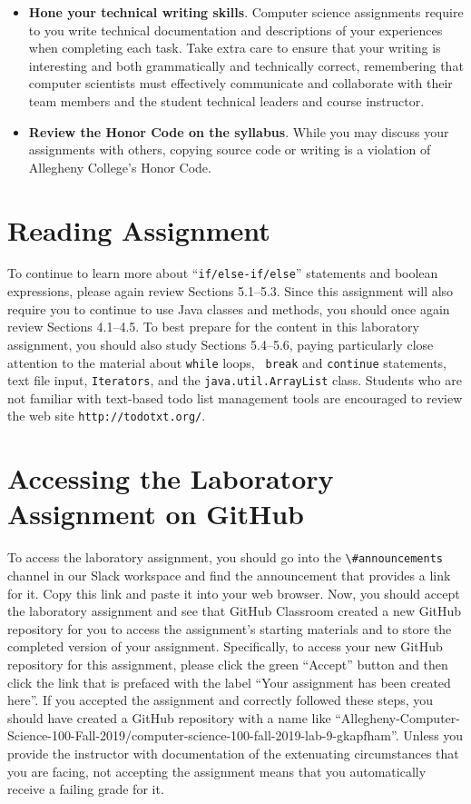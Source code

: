 \documentclass[11pt]{article}
\newcommand{\url}[1]{\lstinline{#1}}
\newcommand{\channel}[1]{\lstinline{#1}}
\begin{document}
\begin{itemize}
\item {\bf Hone your technical writing skills}. Computer science assignments
  require to you write technical documentation and descriptions of your
  experiences when completing each task. Take extra care to ensure that your
  writing is interesting and both grammatically and technically correct,
  remembering that computer scientists must effectively communicate and
  collaborate with their team members and the student technical leaders and
  course instructor.

\item {\bf Review the Honor Code on the syllabus}. While you may discuss your
  assignments with others, copying source code or writing is a violation of
  Allegheny College's Honor Code.

\end{itemize}

\section*{Reading Assignment}

To continue to learn more about ``{\tt if/else-if/else}'' statements and boolean
expressions, please again review Sections 5.1--5.3. Since this assignment will
also require you to continue to use Java classes and methods, you should once
again review Sections 4.1--4.5. To best prepare for the content in this
laboratory assignment, you should also study Sections 5.4--5.6, paying
particularly close attention to the material about {\tt while} loops, {\tt
break} and {\tt continue} statements, text file input, {\tt Iterators}, and the
{\tt java.util.ArrayList} class. Students who are not familiar with text-based
todo list management tools are encouraged to review the web site
\url{http://todotxt.org/}.

\section*{Accessing the Laboratory Assignment on GitHub}

To access the laboratory assignment, you should go into the
\channel{\#announcements} channel in our Slack workspace and find the
announcement that provides a link for it. Copy this link and paste it into your
web browser. Now, you should accept the laboratory assignment and see that
GitHub Classroom created a new GitHub repository for you to access the
assignment's starting materials and to store the completed version of your
assignment. Specifically, to access your new GitHub repository for this
assignment, please click the green ``Accept'' button and then click the link
that is prefaced with the label ``Your assignment has been created here''. If
you accepted the assignment and correctly followed these steps, you should have
created a GitHub repository with a name like
``Allegheny-Computer-Science-100-Fall-2019/computer-science-100-fall-2019-lab-9-gkapfham''.
Unless you provide the instructor with documentation of the extenuating
circumstances that you are facing, not accepting the assignment means that you
automatically receive a failing grade for it.
\end{document}
